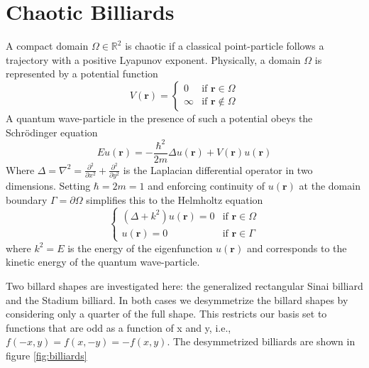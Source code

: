 \documentclass{report}
\newcommand{\rr}[0]{\mathbf{r}}
\begin{document}
\section{Chaotic Billiards}
\label{sec:billiards}
A compact domain $\Omega \in \mathbb{R}^{2}$ is chaotic if a classical point-particle follows a trajectory with a positive Lyapunov exponent. Physically, a domain $\Omega$ is represented by a potential function
\[
V(\rr) =\begin{cases}
0 & \text{if } \rr \in \Omega\\
\infty & \text{if } \rr \notin \Omega
\end{cases}
\]
A quantum wave-particle in the presence of such a potential obeys the Schrödinger equation
\[
E u(\rr) = - \frac{\hbar^{2}}{2m} \Delta u(\rr) + V(\rr) u(\rr)
\]
Where $\Delta = \nabla^{2} = \frac{\partial^{2}}{\partial x^{2}} + \frac{\partial^{2}}{\partial y^{2}}$ is the Laplacian differential operator in two dimensions. Setting $\hbar = 2m = 1$ and enforcing continuity of $u(\rr)$ at the domain boundary $\Gamma = \partial \Omega$ simplifies this to the Helmholtz equation
\begin{equation}
\label{eq:helmholtz}
\begin{cases}
(\Delta + k^{2})u(\rr) = 0 & \text{if } \rr \in \Omega\\
  u(\rr) = 0 & \text{if } \rr \in \Gamma
\end{cases}
\end{equation}
where $k^{2} = E$ is the energy of the eigenfunction $u(\rr)$ and corresponds to the kinetic energy of the quantum wave-particle.

Two billard shapes are investigated here: the generalized rectangular Sinai billiard and the Stadium billiard. In both cases we desymmetrize the billard shapes by considering only a quarter of the full shape. This restricts our basis set to functions that are odd as a function of x and y, i.e., $f(-x,y) = f(x,-y) = -f(x,y)$. The desymmetrized billiards are shown in figure \ref{fig:billiards}
\end{document}
